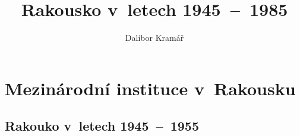 \documentclass[a3 paper]{article}
\title{Rakousko v~letech 1945~--~1985}
\author{Dalibor Kramář}
\makeatletter
\let\thetitle\@title
\makeatother
\begin{document}
\pagestyle{empty}
\begin{landscape}
\begin{center}
	{\fontsize{1cm}{1cm} \selectfont \textbf{\thetitle}}
\end{center}
\begin{minipage}[c]{\linewidth}
\centering
\begin{minipage}[t]{0.2\linewidth}
	\section*{Mezinárodní instituce v~Rakousku}
	\lipsum[1]
\end{minipage}
\hspace{0.5cm}
\begin{minipage}[t]{0.5\linewidth}
	\subsection*{Rakouko v~letech 1945~--~1955}
	\lipsum[2]
\end{minipage}
\hspace{0.5cm}
\begin{minipage}[t]{0.25\linewidth}
	\lipsum[1]
\end{minipage}
\end{minipage}
\end{landscape}
\end{document}
